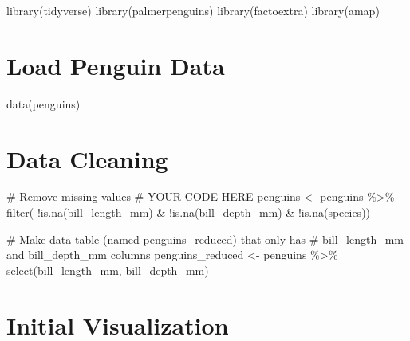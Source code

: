 \documentclass[
  letterpaper,
  DIV=11,
  numbers=noendperiod]{scrartcl}
\newenvironment{Shaded}{\begin{snugshade}}{\end{snugshade}}
\newcommand{\CommentTok}[1]{\textcolor[rgb]{0.37,0.37,0.37}{#1}}
\newcommand{\FunctionTok}[1]{\textcolor[rgb]{0.28,0.35,0.67}{#1}}
\newcommand{\NormalTok}[1]{\textcolor[rgb]{0.00,0.23,0.31}{#1}}
\newcommand{\OtherTok}[1]{\textcolor[rgb]{0.00,0.23,0.31}{#1}}
\newcommand{\SpecialCharTok}[1]{\textcolor[rgb]{0.37,0.37,0.37}{#1}}
\begin{document}
\begin{Shaded}
\begin{Highlighting}[]
\FunctionTok{library}\NormalTok{(tidyverse)}
\FunctionTok{library}\NormalTok{(palmerpenguins)}
\FunctionTok{library}\NormalTok{(factoextra)}
\FunctionTok{library}\NormalTok{(amap)}
\end{Highlighting}
\end{Shaded}

\section{Load Penguin Data}\label{load-penguin-data}

\begin{Shaded}
\begin{Highlighting}[]
\FunctionTok{data}\NormalTok{(penguins)}
\end{Highlighting}
\end{Shaded}

\section{Data Cleaning}\label{data-cleaning}

\begin{Shaded}
\begin{Highlighting}[]
\CommentTok{\# Remove missing values}
\CommentTok{\# YOUR CODE HERE}
\NormalTok{penguins }\OtherTok{\textless{}{-}}\NormalTok{ penguins }\SpecialCharTok{\%\textgreater{}\%}
  \FunctionTok{filter}\NormalTok{(}
    \SpecialCharTok{!}\FunctionTok{is.na}\NormalTok{(bill\_length\_mm) }\SpecialCharTok{\&}
    \SpecialCharTok{!}\FunctionTok{is.na}\NormalTok{(bill\_depth\_mm) }\SpecialCharTok{\&}
    \SpecialCharTok{!}\FunctionTok{is.na}\NormalTok{(species))}

\CommentTok{\# Make data table (named penguins\_reduced) that only has}
\CommentTok{\# bill\_length\_mm and bill\_depth\_mm columns}
\NormalTok{penguins\_reduced }\OtherTok{\textless{}{-}}\NormalTok{ penguins  }\SpecialCharTok{\%\textgreater{}\%} \FunctionTok{select}\NormalTok{(bill\_length\_mm, bill\_depth\_mm)}
\end{Highlighting}
\end{Shaded}

\section{Initial Visualization}\label{initial-visualization}
\end{document}
